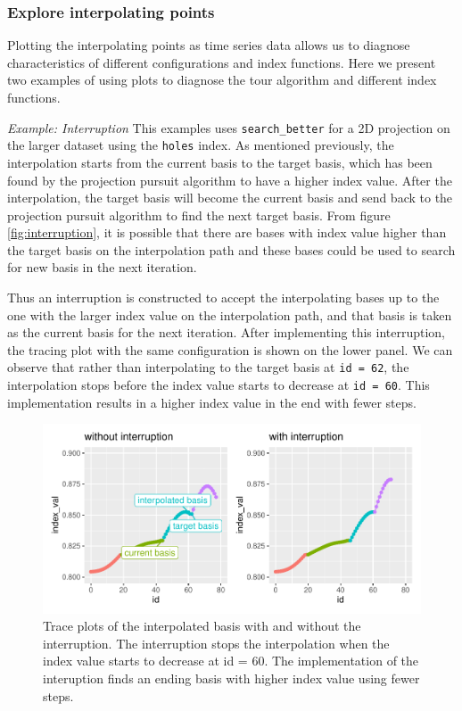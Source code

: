 \documentclass[12pt]{article}
\begin{document}
\hypertarget{explore-interpolating-points}{%
\subsubsection{Explore interpolating
points}\label{explore-interpolating-points}}

Plotting the interpolating points as time series data allows us to
diagnose characteristics of different configurations and index
functions. Here we present two examples of using plots to diagnose the
tour algorithm and different index functions.

\emph{Example: Interruption} This examples uses \texttt{search\_better}
for a 2D projection on the larger dataset using the \texttt{holes}
index. As mentioned previously, the interpolation starts from the
current basis to the target basis, which has been found by the
projection pursuit algorithm to have a higher index value. After the
interpolation, the target basis will become the current basis and send
back to the projection pursuit algorithm to find the next target basis.
From figure \ref{fig:interruption}, it is possible that there are bases
with index value higher than the target basis on the interpolation path
and these bases could be used to search for new basis in the next
iteration.

Thus an interruption is constructed to accept the interpolating bases up
to the one with the larger index value on the interpolation path, and
that basis is taken as the current basis for the next iteration. After
implementing this interruption, the tracing plot with the same
configuration is shown on the lower panel. We can observe that rather
than interpolating to the target basis at \texttt{id\ =\ 62}, the
interpolation stops before the index value starts to decrease at
\texttt{id\ =\ 60}. This implementation results in a higher index value
in the end with fewer steps.

\begin{figure}
\centering
\includegraphics{paper_files/figure-latex/interruption-1.pdf}
\caption{\label{interruption}Trace plots of the interpolated basis with
and without the interruption. The interruption stops the interpolation
when the index value starts to decrease at id = 60. The implementation
of the interuption finds an ending basis with higher index value using
fewer steps.}
\end{figure}
\end{document}
